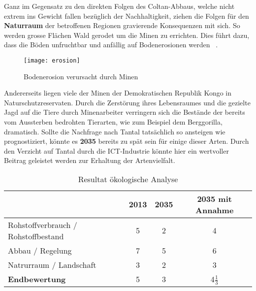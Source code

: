 Ganz im Gegensatz zu den direkten Folgen des Coltan-Abbaus, welche nicht extrem
ins Gewicht fallen bezüglich der Nachhaltigkeit, ziehen die Folgen für den
\textbf{Naturraum} der betroffenen Regionen gravierende Konsequenzen mit sich.
So werden grosse Flächen Wald gerodet um die Minen zu errichten. Dies führt
dazu, dass die Böden unfruchtbar und anfällig auf Bodenerosionen
werden ~\cite{environmental_management}.

\begin{figure}[h]
\centering
\texttt{[image: erosion]}
\caption{Bodenerosion verursacht durch Minen ~\cite{Coltanmi34:online}}
\label{}
\end{figure}
\pagebreak

Andererseits liegen viele der Minen der Demokratischen Republik Kongo in
Naturschutzreservaten. Durch die Zerstörung ihres Lebensraumes und die gezielte
Jagd auf die Tiere durch Minenarbeiter verringern sich die Bestände der bereits
vom Aussterben bedrohten Tierarten, wie zum Beispiel dem Berggorilla, dramatisch.
Sollte die Nachfrage nach Tantal tatsächlich so ansteigen wie prognostiziert,
könnte es \textbf{2035} bereits zu spät sein für einige dieser Arten.
Durch den Verzicht auf Tantal durch die ICT-Industrie könnte hier ein wertvoller
Beitrag geleistet werden zur Erhaltung der Artenvielfalt.

\begin{table}[h]
  \centering
  \begin{tabular}{l|ccc}                                    & \textbf{2013} & \textbf{2035} & \textbf{2035 mit Annahme}
    \\ \hline Rohstoffverbrauch / Rohstoffbestand                 & 5             & 2             & 4 
    \\ Abbau / Regelung                                           & 7             & 5             & 6
    \\ Natrurraum / Landschaft                                    & 3             & 2             & 3
    \\ \hline \textbf{Endbewertung}                               & 5             & 3             & 4\(\frac{1}{3}\)
  \end{tabular}
  \caption{Resultat ökologische Analyse}
\end{table}
